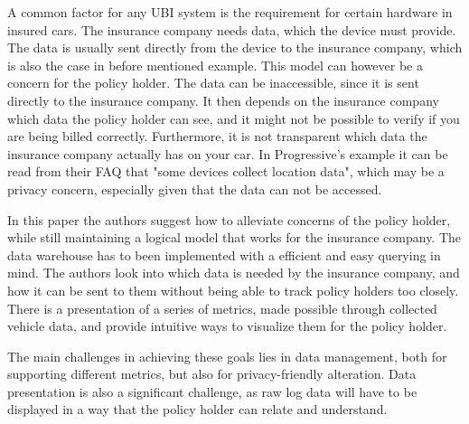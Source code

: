A common factor for any UBI system is the requirement for certain hardware in insured cars. The insurance company needs data, which the device must provide. The data is usually sent directly from the device to the insurance company, which is also the case in before mentioned example. This model can however be a concern for the policy holder. The data can be inaccessible, since it is sent directly to the insurance company. It then depends on the insurance company which data the policy holder can see, and it might not be possible to verify if you are being billed correctly. Furthermore, it is not transparent which data the insurance company actually has on your car. In Progressive's example it can be read from their FAQ that "some devices collect location data", which may be a privacy concern, especially given that the data can not be accessed.

In this paper the authors suggest how to alleviate concerns of the policy holder, while still maintaining a logical model that works for the insurance company. The data warehouse has to been implemented with a efficient and easy querying in mind. The authors look into which data is needed by the insurance company, and how it can be sent to them without being able to track policy holders too closely. There is a presentation of a series of metrics, made possible through collected vehicle data, and provide intuitive ways to visualize them for the policy holder.

The main challenges in achieving these goals lies in data management, both for supporting different metrics, but also for privacy-friendly alteration. Data presentation is also a significant challenge, as raw log data will have to be displayed in a way that the policy holder can relate and understand.
